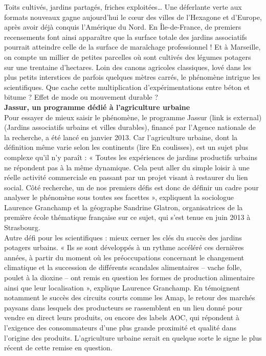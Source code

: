 \documentclass[8pt]{article}
\begin{document}
Toits cultivés, jardins partagés, friches exploitées… Une déferlante verte aux formats nouveaux gagne aujourd’hui le cœur des villes de l’Hexagone et d’Europe, après avoir déjà conquis l’Amérique du Nord. En Île-de-France, de premiers recensements font ainsi apparaître que la surface totale des jardins associatifs pourrait atteindre celle de la surface de maraîchage professionnel ! Et à Marseille, on compte un millier de petites parcelles où sont cultivés des légumes potagers sur une trentaine d’hectares. Loin des canons agricoles classiques, lové dans les plus petits interstices de parfois quelques mètres carrés, le phénomène intrigue les scientifiques. Que cache cette multiplication d’expérimentations entre béton et bitume ? Effet de mode ou mouvement durable ?\\

\textbf{Jassur, un programme dédié à l’agriculture urbaine}\\

Pour essayer de mieux saisir le phénomène, le programme Jassur (link is external) (Jardins associatifs urbains et villes durables), financé par l’Agence nationale de la recherche, a été lancé en janvier 2013. Car l’agriculture urbaine, dont la définition même varie selon les continents (lire En coulisses), est un sujet plus complexe qu’il n’y paraît : « Toutes les expériences de jardins productifs urbains ne répondent pas à la même dynamique. Cela peut aller du simple loisir à une réelle activité commerciale en passant par un projet visant à restaurer du lien social. Côté recherche, un de nos premiers défis est donc de définir un cadre pour analyser le phénomène sous toutes ses facettes », expliquent la sociologue Laurence Granchamp et la géographe Sandrine Glatron, organisatrices de la première école thématique française sur ce sujet, qui s’est tenue en juin 2013 à Strasbourg.\\

Autre défi pour les scientifiques : mieux cerner les clés du succès des jardins potagers urbains. « Ils se sont développés à un rythme accéléré ces dernières années, à partir du moment où les préoccupations concernant le changement climatique et la succession de différents scandales alimentaires – vache folle, poulet à la dioxine – ont remis en question les formes de production alimentaire ainsi que leur localisation », explique Laurence Granchamp. En témoignent notamment le succès des circuits courts comme les Amap, le retour des marchés paysans dans lesquels des producteurs se rassemblent en un lieu donné pour vendre en direct leurs produits, ou encore des labels AOC, qui répondent à l’exigence des consommateurs d’une plus grande proximité et qualité dans l’origine des produits. L’agriculture urbaine serait en quelque sorte le signe le plus récent de cette remise en question.\\
\end{document}
